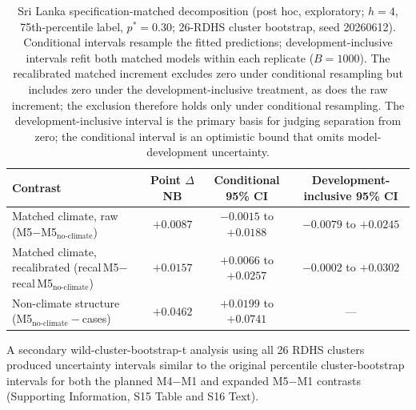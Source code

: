 \documentclass[11pt,a4paper]{article}
\begin{document}
\begin{table}[htbp]
\centering
\caption{Sri Lanka specification-matched decomposition (post hoc, exploratory; $h=4$, 75th-percentile label, $p^*=0.30$; 26-RDHS cluster bootstrap, seed 20260612). Conditional intervals resample the fitted predictions; development-inclusive intervals refit both matched models within each replicate ($B=1000$). The recalibrated matched increment excludes zero under conditional resampling but includes zero under the development-inclusive treatment, as does the raw increment; the exclusion therefore holds only under conditional resampling. The development-inclusive interval is the primary basis for judging separation from zero; the conditional interval is an optimistic bound that omits model-development uncertainty.}
\label{tab:slmatched}
\footnotesize{}
\begin{tabular}{@{}lccc@{}}
\toprule
Contrast & Point $\Delta$NB & Conditional 95\% CI & Development-inclusive 95\% CI \\
\midrule
Matched climate, raw (M5$-$M5$_{\text{no-climate}}$) & $+0.0087$ & $-0.0015$ to $+0.0188$ & $-0.0079$ to $+0.0245$ \\
Matched climate, recalibrated (recal\,M5$-$recal\,M5$_{\text{no-climate}}$) & $+0.0157$ & $+0.0066$ to $+0.0257$ & $-0.0002$ to $+0.0302$ \\
Non-climate structure (M5$_{\text{no-climate}}-$cases) & $+0.0462$ & $+0.0199$ to $+0.0741$ & --- \\
\bottomrule
\end{tabular}
\end{table} A secondary wild-cluster-bootstrap-t analysis using all 26 RDHS clusters produced uncertainty intervals similar to the original percentile cluster-bootstrap intervals for both the planned M4$-$M1 and expanded M5$-$M1 contrasts (Supporting Information, S15 Table and S16 Text).
\end{document}
